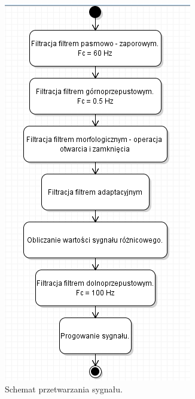 \documentclass[10pt,a4paper]{article}
\begin{document}
\begin{figure}
  	\centering
    \includegraphics{dom5}
    \caption{Schemat przetwarzania sygnału.}
 	 \label{fig:dom5}
\end{figure}
	
\end{document}
